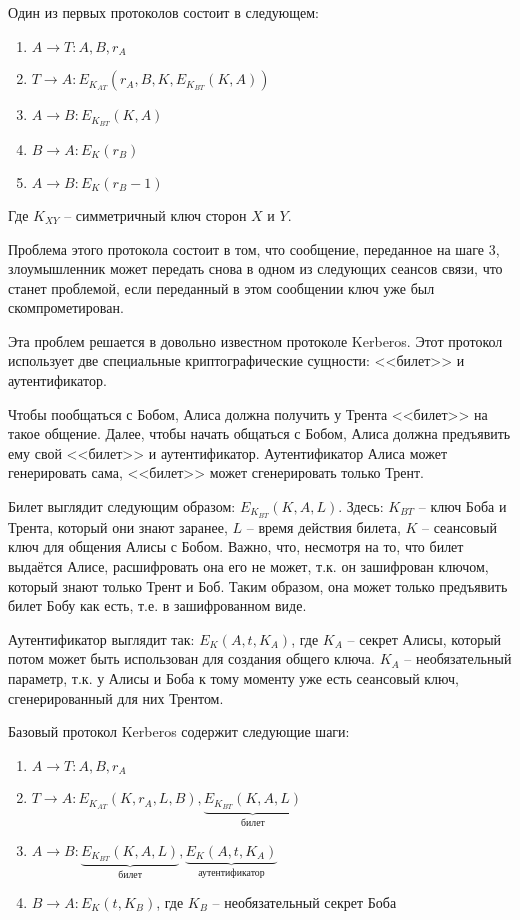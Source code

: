 Один из первых протоколов состоит в следующем:

\begin{enumerate}
	\item $A \rightarrow T: A, B, r_A$
	\item $T \rightarrow A: E_{K_{AT}}(r_A, B, K, E_{K_{BT}}(K, A))$
	\item $A \rightarrow B: E_{K_{BT}}(K, A)$
	\item $B \rightarrow A: E_K(r_B)$
	\item $A \rightarrow B: E_K(r_B - 1)$
\end{enumerate}

Где $K_{XY}$ -- симметричный ключ сторон $X$ и $Y$. 

Проблема этого протокола состоит в том, что сообщение, переданное на шаге 3, злоумышленник может передать снова в одном из следующих сеансов связи, что станет проблемой, если переданный в этом сообщении ключ уже был скомпрометирован. 

Эта проблем решается в довольно известном протоколе Kerberos. Этот протокол использует две специальные криптографические сущности: <<билет>> и аутентификатор. 

Чтобы пообщаться с Бобом, Алиса должна получить у Трента <<билет>> на такое общение. Далее, чтобы начать общаться с Бобом, Алиса должна предъявить ему свой <<билет>> и аутентификатор. Аутентификатор Алиса может генерировать сама, <<билет>> может сгенерировать только Трент.

Билет выглядит следующим образом: $E_{K_{BT}}(K, A, L)$. Здесь: $K_{BT}$ -- ключ Боба и Трента, который они знают заранее, $L$ -- время действия билета, $K$ -- сеансовый ключ для общения Алисы с Бобом. Важно, что, несмотря на то, что билет выдаётся Алисе, расшифровать она его не может, т.к. он зашифрован ключом, который знают только Трент и Боб. Таким образом, она может только предъявить билет Бобу как есть, т.е. в зашифрованном виде. 

Аутентификатор выглядит так: $E_K(A, t, K_A)$, где $K_A$ -- секрет Алисы, который потом может быть использован для создания общего ключа. $K_A$ -- необязательный параметр, т.к. у Алисы и Боба к тому моменту уже есть сеансовый ключ, сгенерированный для них Трентом. 

Базовый протокол Kerberos содержит следующие шаги:

\begin{enumerate}
	\item $A \rightarrow T: A, B, r_A$
	\item $T \rightarrow A: E_{K_{AT}}(K, r_A, L, B), \underbrace{E_{K_{BT}}(K, A, L)}_\text{билет}$
	\item $A \rightarrow B: \underbrace{E_{K_{BT}}(K, A, L)}_\text{билет}, \underbrace{E_K(A, t, K_A)}_\text{аутентификатор}$
	\item $B \rightarrow A: E_K(t, K_B)$, где $K_B$ -- необязательный секрет Боба
\end{enumerate}

